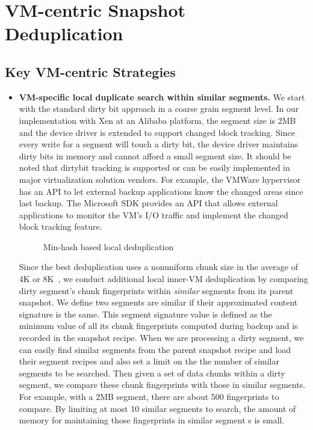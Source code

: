 \section{VM-centric Snapshot Deduplication}
\label{sect:deduplication}

\subsection{Key VM-centric  Strategies}
\label{sect:vc-strategies}
\begin{itemize}
\item \textbf{VM-specific local duplicate search within similar segments.}
We start with the standard dirty bit approach in a coarse grain segment level.
In our implementation with Xen at an Alibaba platform, the segment size is 2MB
and  the device driver is extended to support  changed block tracking. 
Since every write for a segment will touch a dirty bit, the device driver maintains dirty bits in memory
and cannot afford a small segment  size.
It should be noted that dirtybit tracking is supported or can be easily implemented in 
major virtualization solution vendors. For example,
the VMWare hypervisor has an API to let external backup applications know 
the changed areas since last backup. 
The Microsoft SDK provides an API that allows external applications to monitor 
the VM's I/O traffic and implement  the changed block tracking feature.

\begin{figure}[htbp]
  \centering
  \caption{Min-hash based local deduplication}
  \label{fig:local_dedup}
\end{figure}

Since the best deduplication uses a nonuniform chunk size 
in the average of 4K or 8K~\cite{Jin2009},
we conduct additional local inner-VM deduplication by comparing
dirty segment's chunk fingerprints within  {\em similar} segments from its parent snapshot. 
We define two segments are similar if their approximated content signature is the same.
This segment signature value is defined as the minimum value of all its chunk fingerprints 
computed during backup and is recorded in the snapshot recipe.
When we are processing a dirty segment,
we can easily find similar segments from the
parent snapshot recipe and load their segment recipes and also set a limit on the 
the number of  similar segments to be  searched. 
 Then 
given a set of data chunks within a dirty segment,  we compare  these chunk fingerprints
with those in similar segments.  
For example, with a 2MB segment, there are about 500 fingerprints to compare. By limiting at most 10 similar
segments to search,
the amount of memory for maintaining those fingerprints in similar segment s is small.


\end{itemize}
